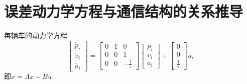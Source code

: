 
\section {误差动力学方程与通信结构的关系推导}
每辆车的动力学方程
\begin{equation}
\begin{bmatrix}
\dot{p}_{i} \\
\dot{v}_{i} \\
\dot{a}_{i}
\end{bmatrix} =\begin{bmatrix}
 0 & 1 & 0\\
 0 & 0 & 1\\
 0 & 0 &-\frac{1}{\tau}
\end{bmatrix}\begin{bmatrix}
p_{i} \\
v_{i} \\
a_{i}
\end{bmatrix} +\begin{bmatrix}
0 \\
0 \\
\frac{1}{\tau}
\end{bmatrix}u_{i}
\end{equation}
即$\dot{x}=Ax+Bu$

